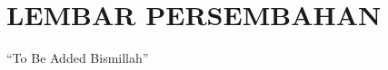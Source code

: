 {}
\chapter*{\uppercase{LEMBAR PERSEMBAHAN}}
\vspace{1cm}

\begin{center}
    ``To Be Added Bismillah''
\end{center}

\newpage
